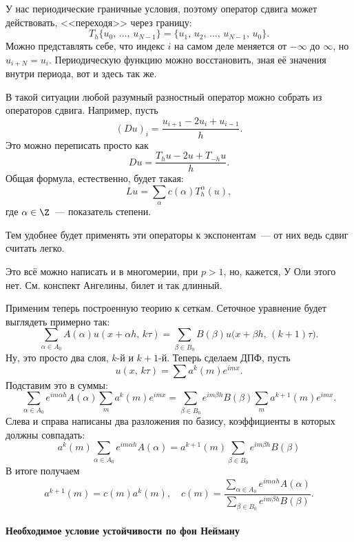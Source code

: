 \documentclass{trlnotes}
\begin{document}
	\begin{rem}
		У нас периодические граничные условия, поэтому оператор сдвига может действовать, <<переходя>> через границу:
		\[
			T_h \{u_0, \, \ldots, \, u_{N - 1}\} = \{u_{1}, \, u_2, \, \ldots, \, u_{N-1}, \, u_0\}.
		\]
		Можно представлять себе, что индекс $i$ на самом деле меняется от $-\infty$ до $\infty$, но $u_{i + N} = u_i$. Периодическую функцию можно восстановить, зная её значения внутри периода, вот и здесь так же.
	\end{rem}

	\begin{rem}
		В такой ситуации любой разумный разностный оператор можно собрать из операторов сдвига. Например, пусть
		\[
			(Du)_i = \dfrac{u_{i + 1} - 2u_i + u_{i - 1}}{h}.
		\]
		Это можно переписать просто как
		\[
			Du = \dfrac{T_hu - 2u + T_{-h}u}{h}.
		\]
		Общая формула, естественно, будет такая:
		\[
			Lu = \sum\limits_{\alpha} c(\alpha) T_h^{\alpha}(u),
		\]
		где $\alpha \in \Z$~--- показатель степени.

		Тем удобнее будет применять эти операторы к экспонентам~--- от них ведь сдвиг считать легко.
	\end{rem}

	Это всё можно написать и в многомерии, при $p>1$, но, кажется, У Оли этого нет. См. конспект Ангелины, билет и так длинный.

	Применим теперь построенную теорию к сеткам. Сеточное уравнение будет выглядеть примерно так:
	\[
		\sum\limits_{\alpha \in A_0} A(\alpha) u(x + \alpha h, \, k \tau) = \sum\limits_{\beta \in B_0} B(\beta) u\big(x + \beta h, \, (k+1) \tau\big).
	\]
	Ну, это просто два слоя, $k$-й и $k+1$-й. Теперь сделаем ДПФ, пусть
	\[
		u(x, \, k\tau) = \sum a^k(m) e^{imx}.
	\]
	Подставим это в суммы:
	\[
		\sum\limits_{\alpha \in A_0} e^{im\alpha h} A(\alpha) \sum\limits_m a^k(m) e^{imx} = \sum\limits_{\beta \in B_0} e^{im\beta h} B(\beta) \sum\limits_m a^{k+1}(m) e^{imx}.
	\]
	Слева и справа написаны два разложения по базису, коэффициенты в которых должны совпадать:
	\[
		a^k(m) \sum\limits_{\alpha \in A_0} e^{im\alpha h} A(\alpha)  = a^{k+1}(m) \sum\limits_{\beta \in B_0} e^{im\beta h} B(\beta) 
	\]
	В итоге получаем
	\[
		a^{k + 1}(m) = c(m) a^k(m), \quad c(m) = \dfrac{\sum\limits_{\alpha \in A_0} e^{im\alpha h} A(\alpha)}{\sum\limits_{\beta \in B_0} e^{im\beta h} B(\beta)}.
	\]

	\paragraph{Необходимое условие устойчивости по фон Нейману}\label{par:neumann}
\end{document}
